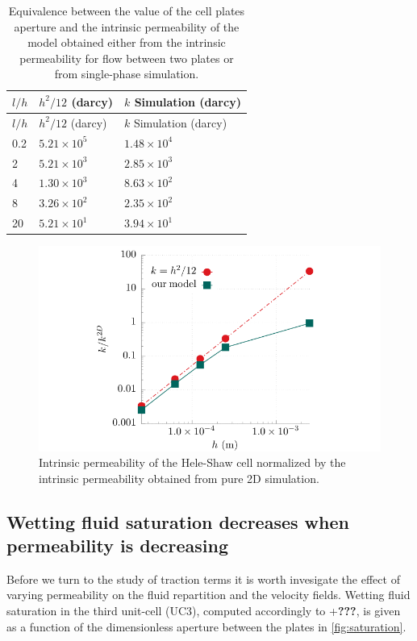 \documentclass[]{article}
\begin{document}
\begin{longtable}[]{@{}lll@{}}
\caption{Equivalence between the value of the cell plates aperture and
the intrinsic permeability of the model obtained either from the
intrinsic permeability for flow between two plates or from single-phase
simulation. \label{tbl:permeability}}\tabularnewline
\toprule
\(l/h\) & \(h^2/12\) (darcy) & \(k\) Simulation (darcy)\tabularnewline
\midrule
\endfirsthead
\toprule
\(l/h\) & \(h^2/12\) (darcy) & \(k\) Simulation (darcy)\tabularnewline
\midrule
\endhead
0.2 & \(5.21 \times 10^{5}\) & \(1.48 \times 10^{4}\)\tabularnewline
2 & \(5.21 \times 10^{3}\) & \(2.85 \times 10^{3}\)\tabularnewline
4 & \(1.30 \times 10^{3}\) & \(8.63 \times 10^{2}\)\tabularnewline
8 & \(3.26 \times 10^{2}\) & \(2.35 \times 10^{2}\)\tabularnewline
20 & \(5.21 \times 10^{1}\) & \(3.94 \times 10^{1}\)\tabularnewline
\bottomrule
\end{longtable}

\begin{figure}
\hypertarget{fig:permeability}{%
\centering
\includegraphics{figures/pdf/permeability.pdf}
\caption{Intrinsic permeability of the Hele-Shaw cell normalized by the
intrinsic permeability obtained from pure 2D
simulation.}\label{fig:permeability}
}
\end{figure}

\hypertarget{wetting-fluid-saturation-decreases-when-permeability-is-decreasing}{%
\subsection{Wetting fluid saturation decreases when permeability is
decreasing}\label{wetting-fluid-saturation-decreases-when-permeability-is-decreasing}}

Before we turn to the study of traction terms it is worth invesigate the
effect of varying permeability on the fluid repartition and the velocity
fields. Wetting fluid saturation in the third unit-cell (UC3), computed
accordingly to +\textbf{???}, is given as a function of the
dimensionless aperture between the plates in \cref{fig:saturation}.
\end{document}
